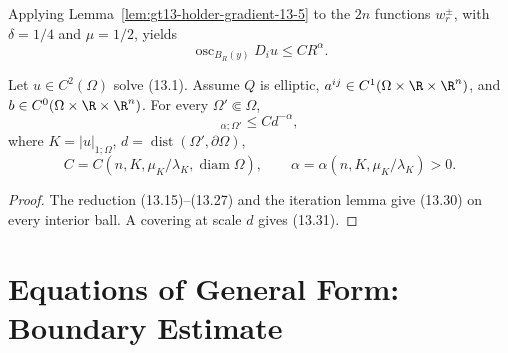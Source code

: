 Applying Lemma~\ref{lem:gt13-holder-gradient-13-5} to the $2n$ functions
$w_r^\pm$, with $\delta=1/4$ and $\mu=1/2$, yields
\begin{equation}
\operatorname{osc}_{B_R(y)}D_iu\le CR^\alpha.
\tag{13.30}
\end{equation}

\begin{theorem}
\label{thm:gt13-holder-gradient-13-6}
Let $u\in C^2(\Omega)$ solve \textup{(13.1)}.  Assume $Q$ is elliptic,
$a^{ij}\in C^1(\Omega\times\R\times\R^n)$, and
$b\in C^0(\Omega\times\R\times\R^n)$.  For every
$\Omega'\Subset\Omega$,
\begin{equation}
[Du]_{\alpha;\Omega'}\le Cd^{-\alpha},
\tag{13.31}
\end{equation}
where $K=|u|_{1;\Omega}$, $d=\operatorname{dist}(\Omega',\partial\Omega)$,
\[
C=C(n,K,\mu_K/\lambda_K,\operatorname{diam}\Omega),
\qquad
\alpha=\alpha(n,K,\mu_K/\lambda_K)>0.
\]
\end{theorem}
\begin{proof}
\sketch The reduction \textup{(13.15)--(13.27)} and the iteration lemma
give \textup{(13.30)} on every interior ball.  A covering at scale $d$
gives \textup{(13.31)}.
\end{proof}

\section{Equations of General Form: Boundary Estimate}

